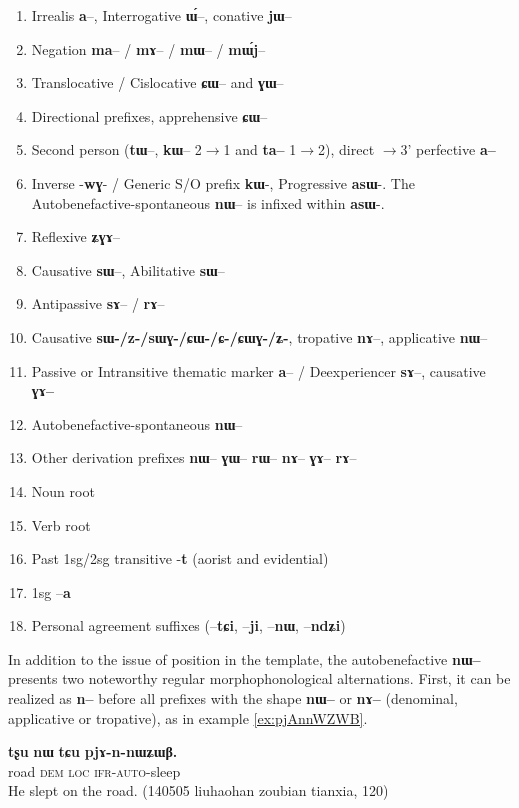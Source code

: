 \documentclass[oldfontcommands,oneside,a4paper,11pt]{article}
\newcommand{\ipa}[1]{\textbf{{\phon\mbox{#1}}}} %
\begin{document}
\begin{landscape}
\begin{multicols}{2}
\begin{enumerate}
\item Irrealis  \ipa{a}--, Interrogative \ipa{ɯ́}--, conative \ipa{jɯ}--
\item Negation \ipa{ma}-- / \ipa{mɤ}-- / \ipa{mɯ}-- / \ipa{mɯ́j}--
\item Translocative / Cislocative \ipa{ɕɯ}-- and \ipa{ɣɯ}--
\item Directional prefixes, apprehensive \ipa{ɕɯ}--
\item Second person (\ipa{tɯ}--, \ipa{kɯ}-- 2$\rightarrow$1 and  \ipa{ta--} 1$\rightarrow$2), direct $\rightarrow$3' perfective \ipa{a--}
\item Inverse -\ipa{wɣ}- / Generic S/O prefix \ipa{kɯ}-, Progressive \ipa{asɯ}-. The Autobenefactive-spontaneous \ipa{nɯ}-- is infixed within \ipa{asɯ}-.
\item Reflexive \ipa{ʑɣɤ}-- 
\item Causative \ipa{sɯ}--, Abilitative \ipa{sɯ}--
\item  Antipassive  \ipa{sɤ}-- / \ipa{rɤ}--
\item Causative \ipa{sɯ-/z-/sɯɣ-/ɕɯ-/ɕ-/ɕɯɣ-/ʑ-}, tropative \ipa{nɤ}--, applicative \ipa{nɯ}--
\item Passive or Intransitive thematic marker \ipa{a}-- / Deexperiencer \ipa{sɤ}--, causative \ipa{ɣɤ--}
\item Autobenefactive-spontaneous \ipa{nɯ}--
\item Other derivation prefixes \ipa{nɯ}-- \ipa{ɣɯ}-- \ipa{rɯ}-- \ipa{nɤ}-- \ipa{ɣɤ}-- \ipa{rɤ}--
\item Noun root
\item Verb root 
\item Past 1sg/2sg transitive -\ipa{t} (aorist and evidential)
\item 1sg --\ipa{a}
\item Personal agreement suffixes (--\ipa{tɕi}, --\ipa{ji}, --\ipa{nɯ}, --\ipa{ndʑi})
\end{enumerate}


\end{multicols}
  \end{landscape}
 
 
In addition to the issue of position in the template, the autobenefactive \ipa{nɯ--} presents two noteworthy regular morphophonological alternations. First, it can be realized as \ipa{n--} before all prefixes with the shape \ipa{nɯ--} or \ipa{nɤ--} (denominal, applicative or tropative), as in example \ref{ex:pjAnnWZWB}.
 
 \begin{exe}
\ex \label{ex:pjAnnWZWB}
\gll  \ipa{tʂu} 	\ipa{nɯ} \ipa{tɕu} \ipa{pjɤ-n-nɯʑɯβ.} \\
road \textsc{dem} \textsc{loc} \textsc{ifr-auto}-sleep \\
\glt He slept on the road. (140505 liuhaohan zoubian tianxia, 120)
\end{exe}
\end{document}
